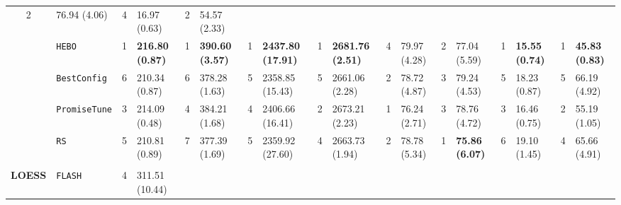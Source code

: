 \begin{tabular}{clllllllllllllllll}
  2 &
  \multicolumn{1}{l|}{76.94 (4.06)} &
  4 &
  \multicolumn{1}{l|}{16.97 (0.63)} &
  2 &
  54.57 (2.33) \\
\multicolumn{1}{c|}{} &
  \multicolumn{1}{l|}{\texttt{HEBO}} &
  \cellcolor{blue!15}1 &
  \multicolumn{1}{l|}{\cellcolor{blue!15}\textbf{216.80 (0.87)}} &
  \cellcolor{blue!15}1 &
  \multicolumn{1}{l|}{\cellcolor{blue!15}\textbf{390.60 (3.57)}} &
  \cellcolor{blue!15}1 &
  \multicolumn{1}{l|}{\cellcolor{blue!15}\textbf{2437.80 (17.91)}} &
  \cellcolor{blue!15}1 &
  \multicolumn{1}{l|}{\cellcolor{blue!15}\textbf{2681.76 (2.51)}} &
  4 &
  \multicolumn{1}{l|}{79.97 (4.28)} &
  2 &
  \multicolumn{1}{l|}{77.04 (5.59)} &
  \cellcolor{blue!15}1 &
  \multicolumn{1}{l|}{\cellcolor{blue!15}\textbf{15.55 (0.74)}} &
  \cellcolor{blue!15}1 &
  \cellcolor{blue!15}\textbf{45.83 (0.83)} \\
\multicolumn{1}{c|}{} &
  \multicolumn{1}{l|}{\texttt{BestConfig}} &
  6 &
  \multicolumn{1}{l|}{210.34 (0.87)} &
  6 &
  \multicolumn{1}{l|}{378.28 (1.63)} &
  5 &
  \multicolumn{1}{l|}{2358.85 (15.43)} &
  5 &
  \multicolumn{1}{l|}{2661.06 (2.28)} &
  2 &
  \multicolumn{1}{l|}{78.72 (4.87)} &
  3 &
  \multicolumn{1}{l|}{79.24 (4.53)} &
  5 &
  \multicolumn{1}{l|}{18.23 (0.87)} &
  5 &
  66.19 (4.92) \\
\multicolumn{1}{c|}{} &
  \multicolumn{1}{l|}{\texttt{PromiseTune}} &
  3 &
  \multicolumn{1}{l|}{214.09 (0.48)} &
  4 &
  \multicolumn{1}{l|}{384.21 (1.68)} &
  4 &
  \multicolumn{1}{l|}{2406.66 (16.41)} &
  2 &
  \multicolumn{1}{l|}{2673.21 (2.23)} &
  \cellcolor{blue!15}1 &
  \multicolumn{1}{l|}{\cellcolor{blue!15}76.24 (2.71)} &
  3 &
  \multicolumn{1}{l|}{78.76 (4.72)} &
  3 &
  \multicolumn{1}{l|}{16.46 (0.75)} &
  2 &
  55.19 (1.05) \\
\multicolumn{1}{c|}{} &
  \multicolumn{1}{l|}{\texttt{RS}} &
  5 &
  \multicolumn{1}{l|}{210.81 (0.89)} &
  7 &
  \multicolumn{1}{l|}{377.39 (1.69)} &
  5 &
  \multicolumn{1}{l|}{2359.92 (27.60)} &
  4 &
  \multicolumn{1}{l|}{2663.73 (1.94)} &
  2 &
  \multicolumn{1}{l|}{78.78 (5.34)} &
  \cellcolor{blue!15}1 &
  \multicolumn{1}{l|}{\cellcolor{blue!15}\textbf{75.86 (6.07)}} &
  6 &
  \multicolumn{1}{l|}{19.10 (1.45)} &
  4 &
  65.66 (4.91) \\
\hline
\multicolumn{1}{l}{\textbf{}} &
    &
    &
    &
    &
    &
    &
    &
    &
    &
    &
    &
    &
    &
    &
    &
    &
    \\ \hline
\multicolumn{1}{c|}{\multirow{7}{*}{\textbf{LOESS}}} &
  \multicolumn{1}{l|}{\texttt{FLASH}} &
  4 &
  \multicolumn{1}{l|}{311.51 (10.44)} &

\end{tabular}

